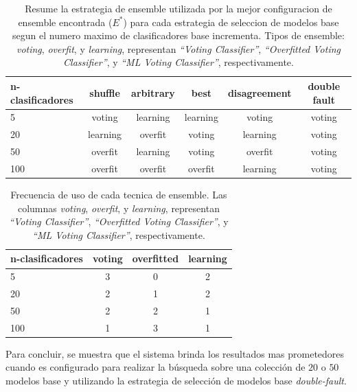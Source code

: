 \begin{table}[H]
    \centering

    \begin{tabular}{lccccc}
    \toprule
        n-clasificadores & shuffle & arbitrary & best & disagreement & double fault  \\ \midrule \midrule
        5   & voting & learning & learning & voting & voting \\
        20  & learning & overfit & voting & learning & voting \\
        50  & overfit & learning & voting & overfit & voting \\
        100 & overfit & overfit & overfit & learning & voting \\
    \bottomrule
    \end{tabular}
    
    \caption{Resume la estrategia de ensemble utilizada por la mejor configuracion de ensemble encontrada ($E^*$) para cada estrategia de seleccion de modelos base segun el numero maximo de clasificadores base incrementa.
    Tipos de ensemble: \emph{voting}, \emph{overfit}, y \emph{learning}, representan \emph{``Voting Classifier''}, \emph{``Overfitted Voting Classifier''}, y \emph{``ML Voting Classifier''}, respectivamente.
    }
    \label{table:types}
\end{table}

\begin{table}[H]
    \centering
    
    \begin{tabular}{lccc}
    \toprule
        n-clasificadores & voting  & overfitted & learning \\ \midrule \midrule
        5   & 3 & 0 & 2 \\
        20  & 2 & 1 & 2 \\
        50  & 2 & 2 & 1 \\
        100 & 1 & 3 & 1 \\
    \bottomrule
    \end{tabular}

    \caption{Frecuencia de uso de cada tecnica de ensemble.
    Las columnas \emph{voting}, \emph{overfit}, y \emph{learning}, representan \emph{``Voting Classifier''}, \emph{``Overfitted Voting Classifier''}, y \emph{``ML Voting Classifier''}, respectivamente.}
    \label{table:types-count}
\end{table}

Para concluir, se muestra que el sistema brinda los resultados mas prometedores cuando es configurado para realizar la búsqueda sobre una colección de $20$ o $50$ modelos base y utilizando la estrategia de selección de modelos base \emph{double-fault}.


